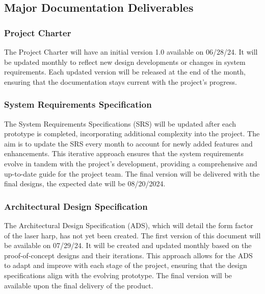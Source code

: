 
\subsection{Major Documentation Deliverables}


\subsubsection{Project Charter}
The Project Charter will have an initial version 1.0 available on 06/28/24. It will be updated monthly to reflect new design developments or changes in system requirements. Each updated version will be released at the end of the month, ensuring that the documentation stays current with the project's progress.

\subsubsection{System Requirements Specification}
The System Requirements Specifications (SRS) will be updated after each prototype is completed, incorporating additional complexity into the project. The aim is to update the SRS every month to account for newly added features and enhancements. This iterative approach ensures that the system requirements evolve in tandem with the project's development, providing a comprehensive and up-to-date guide for the project team. The final version will be delivered with the final designs, the expected date will be 08/20/2024.

\subsubsection{Architectural Design Specification}
The Architectural Design Specification (ADS), which will detail the form factor of the laser harp, has not yet been created. The first version of this document will be available on 07/29/24. It will be created and updated monthly based on the proof-of-concept designs and their iterations. This approach allows for the ADS to adapt and improve with each stage of the project, ensuring that the design specifications align with the evolving prototype. The final version will be available upon the final delivery of the product.

